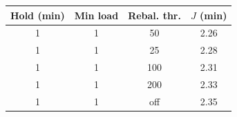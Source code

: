 \begin{tabular}{@{}cccc@{}}\toprule
Hold (min) & Min load & Rebal. thr. & $J$ (min) \\ \midrule
1 & 1 & 50 & 2.26 \\
1 & 1 & 25 & 2.28 \\
1 & 1 & 100 & 2.31 \\
1 & 1 & 200 & 2.33 \\
1 & 1 & off & 2.35 \\
\bottomrule\end{tabular}
